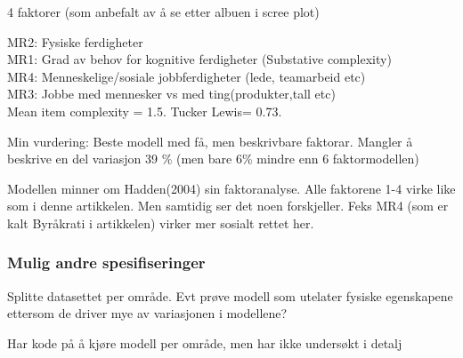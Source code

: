 \documentclass[
]{article}
\begin{document}
4 faktorer (som anbefalt av å se etter albuen i scree plot)

MR2: Fysiske ferdigheter\\
MR1: Grad av behov for kognitive ferdigheter (Substative complexity)\\
MR4: Menneskelige/sosiale jobbferdigheter (lede, teamarbeid etc)\\
MR3: Jobbe med mennesker vs med ting(produkter,tall etc)\\

Mean item complexity = 1.5. Tucker Lewis= 0.73.

Min vurdering: Beste modell med få, men beskrivbare faktorar. Mangler å
beskrive en del variasjon 39 \% (men bare 6\% mindre enn 6
faktormodellen)

Modellen minner om Hadden(2004) sin faktoranalyse. Alle faktorene 1-4
virke like som i denne artikkelen. Men samtidig ser det noen
forskjeller. Feks MR4 (som er kalt Byråkrati i artikkelen) virker mer
sosialt rettet her.

\hypertarget{mulig-andre-spesifiseringer}{%
\subsubsection{Mulig andre
spesifiseringer}\label{mulig-andre-spesifiseringer}}

Splitte datasettet per område. Evt prøve modell som utelater fysiske
egenskapene ettersom de driver mye av variasjonen i modellene?

Har kode på å kjøre modell per område, men har ikke undersøkt i detalj
\end{document}
